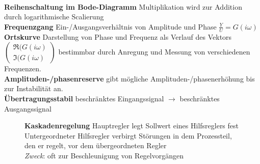 \documentclass{article}
\begin{document}
\begin{multicols}{6}
\\
\textbf{Reihenschaltung im Bode-Diagramm} Multiplikation wird zur Addition durch logarithmische Scalierung
\\
\textbf{Frequenzgang} Ein-/Ausgangsverhältnis von Amplitude und Phase $\displaystyle \frac{Y}{U} = G(i\omega)$ 
\\
\textbf{Ortskurve} Darstellung von Phase und Frequenz als Verlauf des Vektors $\left(\begin{array}{c} \Re(G(i\omega) \\ \Im(G(i\omega) \end{array}\right)$ bestimmbar durch Anregung und Messung von verschiedenen Frequenzen.
\\
\textbf{Amplituden-/phasenreserve} gibt mögliche Amplituden-/phasenerhöhung bis zur Instabilität an.
\\
\textbf{Übertragungsstabil} beschränktes Eingangssignal $\rightarrow$ beschränktes Ausgangssignal
\begin{figure}[H]
\textbf{Kaskadenregelung} Hauptregler legt Sollwert eines Hilfsreglers fest \\
Untergeordneter Hilfsregler verbirgt Störungen in dem Prozessteil, den er regelt, vor dem übergeordneten Regler \\
	\textit{Zweck}: oft zur Beschleunigung von Regelvorgängen


\end{figure}
\end{multicols}
\end{document}
